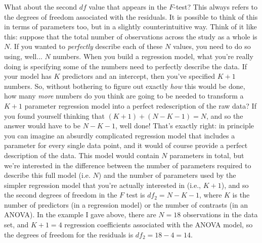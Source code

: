 What about the second $df$ value that appears in the $F$-test? This always refers to the degrees of freedom associated with the residuals. It is possible to think of this in terms of parameters too, but in a slightly counterintuitive way. Think of it like this: suppose that the total number of observations across the study as a whole is $N$. If you wanted to {\it perfectly} describe each of these $N$ values, you need to do so using, well... $N$ numbers. When you build a regression model, what you're really doing is specifying some of the numbers need to perfectly describe the data. If your model has $K$ predictors and an intercept, then you've specified $K+1$ numbers. So, without bothering to figure out exactly {\it how} this would be done, how many {\it more} numbers do you think are going to be needed to transform a $K+1$ parameter regression model into a perfect redescription of the raw data? If you found yourself thinking that $(K+1) + (N-K-1) = N$, and so the answer would have to be $N-K-1$, well done! That's exactly right: in principle you can imagine an absurdly complicated regression model that includes a parameter for every single data point, and it would of course provide a perfect description of the data. This model would contain $N$ parameters in total, but we're interested in the difference between the number of parameters required to describe this full model (i.e. $N$) and the number of parameters used by the simpler regression model that you're actually interested in (i.e., $K+1$), and so the second degrees of freedom in the $F$ test is $df_2 = N-K-1$, where $K$ is the number of predictors (in a regression model) or the number of contrasts (in an ANOVA). In the example I gave above, there are $N=18$ observations in the data set, and $K+1 = 4$ regression coefficients associated with the ANOVA model, so the degrees of freedom for the residuals is $df_2 = 18-4 = 14$. 


